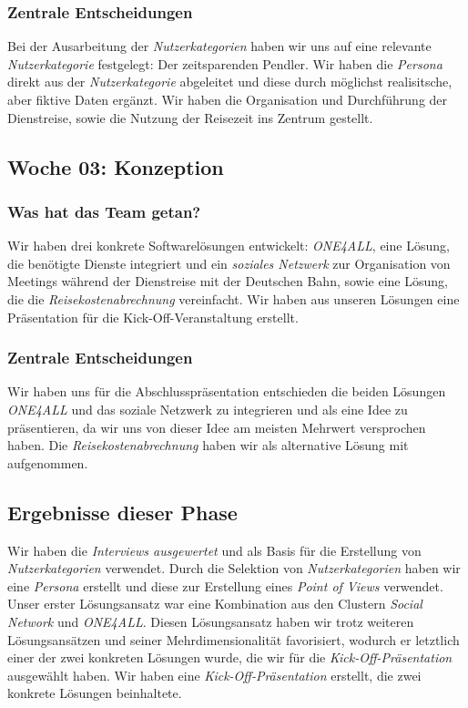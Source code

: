 \documentclass[12pt,a4paper]{article}
\begin{document}
\subsubsection{Zentrale Entscheidungen}

Bei der Ausarbeitung der \textit{Nutzerkategorien} haben wir uns auf eine relevante \textit{Nutzerkategorie} festgelegt: Der zeitsparenden Pendler. Wir haben die \textit{Persona} direkt aus der \textit{Nutzerkategorie} abgeleitet und diese durch m\"oglichst realisitsche, aber fiktive Daten erg\"anzt. Wir haben die Organisation und Durchf\"uhrung der Dienstreise, sowie die Nutzung der Reisezeit ins Zentrum gestellt.

\subsection{Woche 03: Konzeption}

\subsubsection{Was hat das Team getan?}

Wir haben drei konkrete Softwarel\"osungen entwickelt: \textit{ONE4ALL}, eine L\"osung, die ben\"otigte Dienste integriert und ein \textit{soziales Netzwerk} zur Organisation von Meetings w\"ahrend der Dienstreise mit der Deutschen Bahn, sowie eine L\"osung, die die \textit{Reisekostenabrechnung} vereinfacht. Wir haben aus unseren L\"osungen eine Pr\"asentation f\"ur die Kick-Off-Veranstaltung erstellt.

\subsubsection{Zentrale Entscheidungen}

Wir haben uns f\"ur die Abschlusspr\"asentation entschieden die beiden L\"osungen \textit{ONE4ALL} und das soziale Netzwerk zu integrieren und als eine Idee zu pr\"asentieren, da wir uns von dieser Idee am meisten Mehrwert versprochen haben. Die \textit{Reisekostenabrechnung} haben wir als alternative L\"osung mit aufgenommen. 

\subsection{Ergebnisse dieser Phase}

Wir haben die \textit{Interviews ausgewertet} und als Basis f\"ur die Erstellung von \textit{Nutzerkategorien} verwendet. Durch die Selektion von \textit{Nutzerkategorien} haben wir eine \textit{Persona} erstellt und diese zur Erstellung eines \textit{Point of Views} verwendet. Unser erster L\"osungsansatz war eine Kombination aus den Clustern \textit{Social Network} und \textit{ONE4ALL}. Diesen L\"osungsansatz haben wir trotz weiteren L\"osungsans\"atzen und seiner Mehrdimensionalit\"at favorisiert, wodurch er letztlich einer der zwei konkreten L\"osungen wurde, die wir f\"ur die \textit{Kick-Off-Pr\"asentation} ausgew\"ahlt haben. Wir haben eine \textit{Kick-Off-Pr\"asentation} erstellt, die zwei konkrete L\"osungen beinhaltete.
\end{document}
